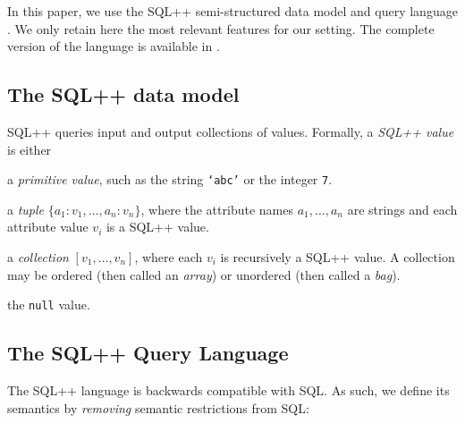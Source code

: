 
In this paper, we use the SQL++ semi-structured data model and query language \cite{ong:2014aa}. We only retain here the most relevant features for our setting. The complete version of the language is available in \cite{ong:2014aa}.

\subsection{The SQL++ data model}

SQL++ queries input and output collections of values. Formally,  a {\em SQL++ value} is either
\begin{compact_enum}
	\item a {\em primitive value}, such as the string {\tt `abc'} or the integer {\tt 7}.
	\item a {\em tuple} $\{ a_1: v_1, \ldots, a_n: v_n \}$, where the attribute names $a_1,\ldots,a_n$ are strings and each attribute value $v_i$ is a SQL++ value.
	\item a {\em collection} $[ v_1, \ldots, v_n ]$, where each $v_i$ is recursively a SQL++ value. A collection may be ordered (then called an \emph{array}) or unordered (then called a \emph{bag}).
	\item the {\tt null} value.
\end{compact_enum}

\subsection{The SQL++ Query Language}

The SQL++ language is backwards compatible with SQL. As such, we define its semantics by \emph{removing} semantic restrictions from SQL:

